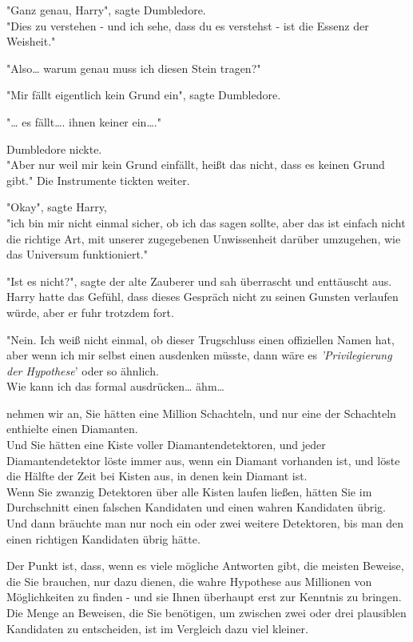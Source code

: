 {"Ganz genau, Harry", sagte Dumbledore.\\ "Dies zu verstehen - und ich sehe, dass du es verstehst - ist die Essenz der Weisheit."

"Also… warum genau muss ich diesen Stein tragen?"

"Mir fällt eigentlich kein Grund ein", sagte Dumbledore.

"… es fällt…. ihnen keiner ein…."

Dumbledore nickte.\\ "Aber nur weil mir kein Grund einfällt, heißt das nicht, dass es keinen Grund gibt." Die Instrumente tickten weiter.

"Okay", sagte Harry,\\ "ich bin mir nicht einmal sicher, ob ich das sagen sollte, aber das ist einfach nicht die richtige Art, mit unserer zugegebenen Unwissenheit darüber umzugehen, wie das Universum funktioniert."

"Ist es nicht?", sagte der alte Zauberer und sah überrascht und enttäuscht aus.\\ Harry hatte das Gefühl, dass dieses Gespräch nicht zu seinen Gunsten verlaufen würde, aber er fuhr trotzdem fort.

"Nein. Ich weiß nicht einmal, ob dieser Trugschluss einen offiziellen Namen hat, aber wenn ich mir selbst einen ausdenken müsste, dann wäre es \emph{'Privilegierung der Hypothese}' oder so ähnlich.\\ Wie kann ich das formal ausdrücken… ähm…

nehmen wir an, Sie hätten eine Million Schachteln, und nur eine der Schachteln enthielte einen Diamanten.\\ Und Sie hätten eine Kiste voller Diamantendetektoren, und jeder Diamantendetektor löste immer aus, wenn ein Diamant vorhanden ist, und löste die Hälfte der Zeit bei Kisten aus, in denen kein Diamant ist.\\ Wenn Sie zwanzig Detektoren über alle Kisten laufen ließen, hätten Sie im Durchschnitt einen falschen Kandidaten und einen wahren Kandidaten übrig.\\ Und dann bräuchte man nur noch ein oder zwei weitere Detektoren, bis man den einen richtigen Kandidaten übrig hätte.

Der Punkt ist, dass, wenn es viele mögliche Antworten gibt, die meisten Beweise, die Sie brauchen, nur dazu dienen, die wahre Hypothese aus Millionen von Möglichkeiten zu finden - und sie Ihnen überhaupt erst zur Kenntnis zu bringen.\\ Die Menge an Beweisen, die Sie benötigen, um zwischen zwei oder drei plausiblen Kandidaten zu entscheiden, ist im Vergleich dazu viel kleiner.

}
